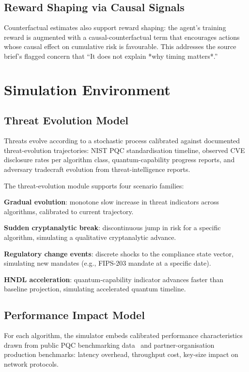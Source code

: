 \documentclass[sigconf,nonacm]{acmart}
\begin{document}
\subsection{Reward Shaping via Causal Signals}

Counterfactual estimates also support reward shaping: the agent's
training reward is augmented with a causal-counterfactual term that
encourages actions whose causal effect on cumulative risk is
favourable. This addresses the source brief's flagged concern that
``It does not explain *why timing matters*.''

\section{Simulation Environment}

\subsection{Threat Evolution Model}

Threats evolve according to a stochastic process calibrated against
documented threat-evolution trajectories: NIST PQC standardisation
timeline, observed CVE disclosure rates per algorithm class,
quantum-capability progress reports, and adversary tradecraft
evolution from threat-intelligence reports.

The threat-evolution module supports four scenario families:

\textbf{Gradual evolution}: monotone slow increase in threat
indicators across algorithms, calibrated to current trajectory.

\textbf{Sudden cryptanalytic break}: discontinuous jump in risk for
a specific algorithm, simulating a qualitative cryptanalytic
advance.

\textbf{Regulatory change events}: discrete shocks to the compliance
state vector, simulating new mandates (e.g., FIPS-203 mandate at a
specific date).

\textbf{HNDL acceleration}: quantum-capability indicator advances
faster than baseline projection, simulating accelerated quantum
timeline.

\subsection{Performance Impact Model}

For each algorithm, the simulator embeds calibrated
performance characteristics drawn from public PQC benchmarking
data~\cite{kannwischer2024pqm4} and partner-organisation production
benchmarks: latency overhead, throughput cost, key-size impact on
network protocols.
\end{document}
